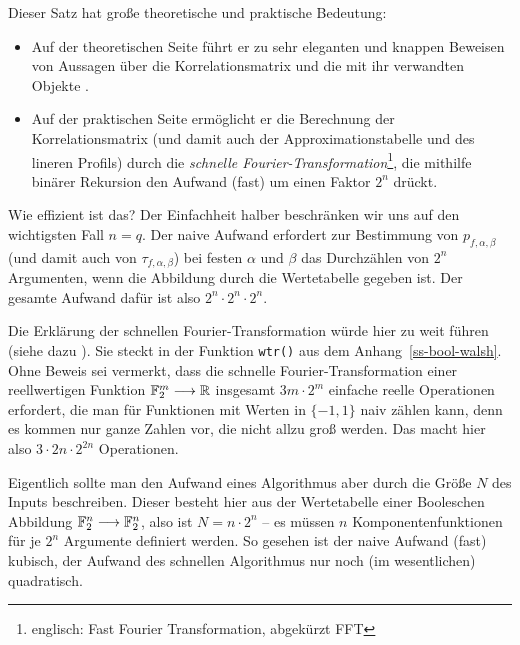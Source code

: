 \begin{refsegment}
Dieser Satz hat große theoretische und praktische Bedeutung:
\begin{itemize}
   \item Auf der theoretischen Seite führt er zu sehr eleganten und
      knappen Beweisen von Aussagen über die
      Korrelationsmatrix und
      die mit ihr verwandten Objekte \cite{Pomm2008}.
   \item Auf der praktischen Seite ermöglicht er die Berechnung der
      Korrelationsmatrix (und damit auch der
      Approximationstabelle und
      des lineren Profils)
      durch die {\em schnelle
      Fourier-Transformation}\footnote{%
         englisch: Fast Fourier Transformation,
         abgekürzt FFT
      }, die mithilfe binärer Rekursion
      den Aufwand (fast) um einen Faktor $2^n$ drückt.
\end{itemize}
Wie effizient ist das? Der Einfachheit halber beschränken wir uns
auf den wichtigsten Fall $n = q$. Der naive Aufwand erfordert zur
Bestimmung von $p_{f,\alpha,\beta}$ (und damit auch von
$\tau_{f,\alpha,\beta}$) bei festen $\alpha$ und $\beta$ das
Durchzählen von $2^n$ Argumenten, wenn die Abbildung durch
die Wertetabelle gegeben ist. Der gesamte Aufwand dafür ist also
$2^n \cdot 2^n \cdot 2^n$.

Die Erklärung der schnellen Fourier-Transformation würde hier zu
weit führen (siehe dazu \cite{Pomm2008}). Sie steckt in der Funktion
\verb:wtr(): aus dem Anhang~\ref{ss-bool-walsh}. Ohne Beweis
sei vermerkt, dass die schnelle Fourier-Transformation
einer reellwertigen Funktion $\mathbb{F}_2^m \longrightarrow \mathbb{R}$ insgesamt
$3m \cdot 2^m$ einfache reelle Operationen erfordert, die man
für Funktionen mit Werten in $\{-1, 1\}$ naiv zählen kann,
denn es kommen nur ganze Zahlen vor, die nicht allzu groß
werden. Das macht hier also $3 \cdot 2n \cdot 2^{2n}$ Operationen.

Eigentlich sollte man den Aufwand eines Algorithmus aber durch die
Größe $N$ des Inputs beschreiben. Dieser besteht hier aus der
Wertetabelle einer Booleschen
Abbildung
$\mathbb{F}_2^n \longrightarrow \mathbb{F}_2^n$,
also ist $N = n \cdot 2^n$ -- es müssen $n$ Komponentenfunktionen
für je $2^n$ Argumente definiert werden. So gesehen ist der naive
Aufwand (fast) kubisch, der Aufwand des schnellen Algorithmus nur
noch (im wesentlichen) quadratisch.


\end{refsegment}
